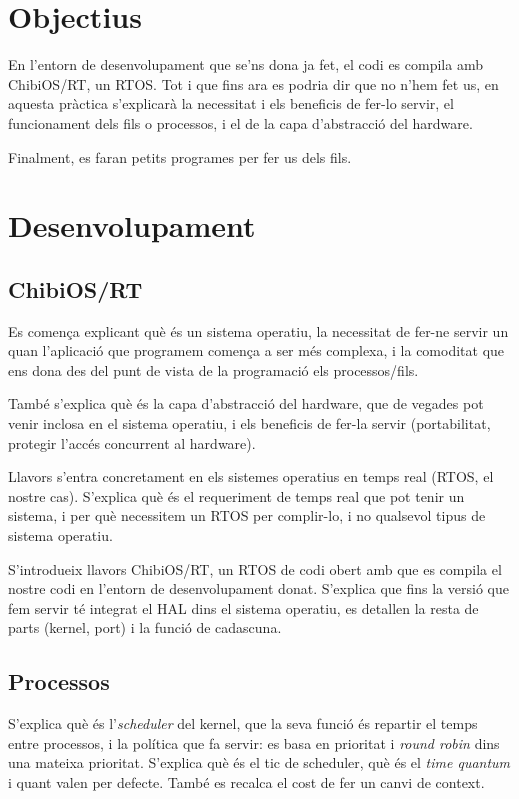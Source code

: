 
\section{Objectius}

En l'entorn de desenvolupament que se'ns dona ja fet, el codi es compila amb
ChibiOS/RT, un RTOS. Tot i que fins ara es podria dir que no n'hem
fet us, en aquesta pràctica s'explicarà la necessitat i els beneficis de fer-lo
servir, el funcionament dels fils o processos, i el de la capa d'abstracció del
hardware.

Finalment, es faran petits programes per fer us dels fils.

\section{Desenvolupament}


\subsection{ChibiOS/RT}

Es comença explicant què és un sistema operatiu, la necessitat de fer-ne servir un quan
l'aplicació que programem comença a ser més complexa, i la comoditat que ens dona des del
punt de vista de la programació els processos/fils.

També s'explica què és la capa d'abstracció del hardware, que de vegades pot venir inclosa
en el sistema operatiu, i els beneficis de fer-la servir (portabilitat, protegir l'accés
concurrent al hardware).

Llavors s'entra concretament en els sistemes operatius en temps real (RTOS, el nostre cas).
S'explica què és el requeriment de temps real que pot tenir un sistema, i per què necessitem
un RTOS per complir-lo, i no qualsevol tipus de sistema operatiu.

S'introdueix llavors ChibiOS/RT, un RTOS de codi obert amb que es compila el nostre codi en
l'entorn de desenvolupament donat. S'explica que fins la versió que fem servir té integrat
el HAL dins el sistema operatiu, es detallen la resta de parts (kernel, port) i la funció
de cadascuna.

\subsection{Processos}

S'explica què és l'\emph{scheduler} del kernel, que la seva funció és repartir el temps entre
processos, i la política que fa servir: es basa en prioritat i \emph{round robin} dins una
mateixa prioritat. S'explica què és el tic de scheduler, què és el \emph{time quantum} i quant
valen per defecte. També es recalca el cost de fer un canvi de context.

